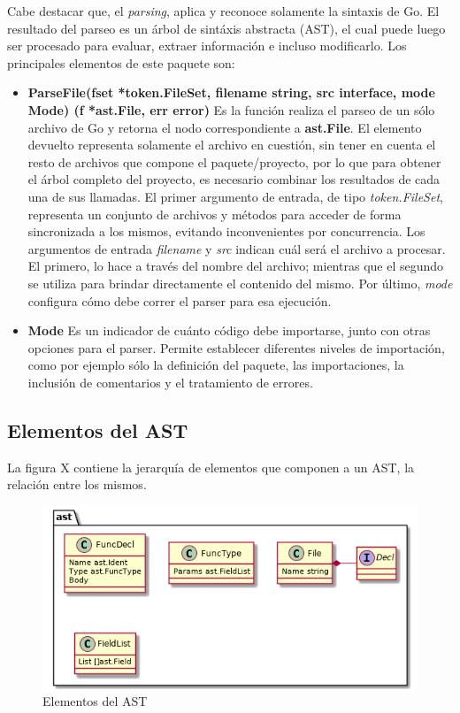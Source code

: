 \begin{itemize}
  Cabe destacar que, el \textit{parsing}, aplica y reconoce solamente la sintaxis de Go.
  El resultado del parseo es un árbol de sintáxis abstracta (AST), el cual puede luego ser procesado 
  para evaluar, extraer información e incluso modificarlo.
  Los principales elementos de este paquete son:
  \begin{itemize}
    \item \textbf{ParseFile(fset *token.FileSet, filename string, src interface{}, mode Mode) (f *ast.File, err error)} 
    Es la función realiza el parseo de un sólo archivo de Go y retorna el nodo correspondiente a \textbf{ast.File}.
    El elemento devuelto representa solamente el archivo en cuestión, sin tener en cuenta el resto de 
    archivos que compone el paquete/proyecto, por lo que para obtener el árbol completo del proyecto, 
    es necesario combinar los resultados de cada una de sus llamadas.
    El primer argumento de entrada, de tipo \textit{token.FileSet}, representa un conjunto de archivos 
    y métodos para acceder de forma sincronizada a los mismos, evitando inconvenientes por concurrencia.
    Los argumentos de entrada \textit{filename} y \textit{src} indican cuál será el archivo a procesar.
    El primero, lo hace a través del nombre del archivo; mientras que el segundo se utiliza para brindar 
    directamente el contenido del mismo.
    Por último, \textit{mode} configura cómo debe correr el parser para esa ejecución.
    \item \textbf{Mode} Es un indicador de cuánto código debe importarse, junto con otras opciones para el parser.
    Permite establecer diferentes niveles de importación, como por ejemplo sólo la definición del paquete, 
    las importaciones, la inclusión de comentarios y el tratamiento de errores.
  \end{itemize}
\end{itemize}

\subsection{Elementos del AST}

La figura X contiene la jerarquía de elementos que componen a un AST, la relación entre los mismos.

\begin{figure}[H]
  \includegraphics[width=12cm]{implementation/elements}
  \centering
  \caption{Elementos del AST}
\end{figure}
